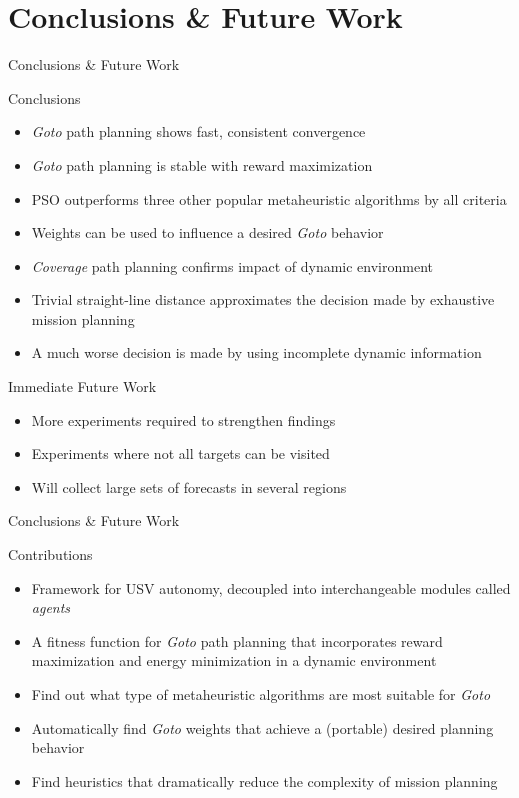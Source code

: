 \documentclass[9pt]{beamer}
\begin{document}
\section{Conclusions \& Future Work}
\begin{frame}{Conclusions \& Future Work}
    \begin{block}{Conclusions}
        \begin{itemize}
	        \item \textit{Goto} path planning shows fast, consistent convergence
	        \item \textit{Goto} path planning is stable with reward maximization
	        \item PSO outperforms three other popular metaheuristic algorithms by all criteria
	        \item Weights can be used to influence a desired \textit{Goto} behavior
	        \item \textit{Coverage} path planning confirms impact of dynamic environment
	        \item Trivial straight-line distance approximates the decision made by exhaustive mission planning
	        \item A much worse decision is made by using incomplete dynamic information 
        \end{itemize}
    \end{block}
    \begin{block}{Immediate Future Work}
        \begin{itemize}
	        \item More experiments required to strengthen findings
	        \item Experiments where not all targets can be visited
	        \item Will collect large sets of forecasts in several regions
        \end{itemize}
    \end{block}
\end{frame}

\begin{frame}{Conclusions \& Future Work}
    \begin{block}{Contributions}
        \begin{itemize}
	        \item Framework for USV autonomy, decoupled into interchangeable modules called \textit{agents}
    	    \item A fitness function for \textit{Goto} path planning that incorporates reward maximization and energy minimization in a dynamic environment
            \item Find out what type of metaheuristic algorithms are most suitable for \textit{Goto}
	        \item Automatically find \textit{Goto} weights that achieve a (portable) desired planning behavior
	        \item Find heuristics that dramatically reduce the complexity of mission planning
        \end{itemize}
    \end{block}
\end{frame}
\end{document}

